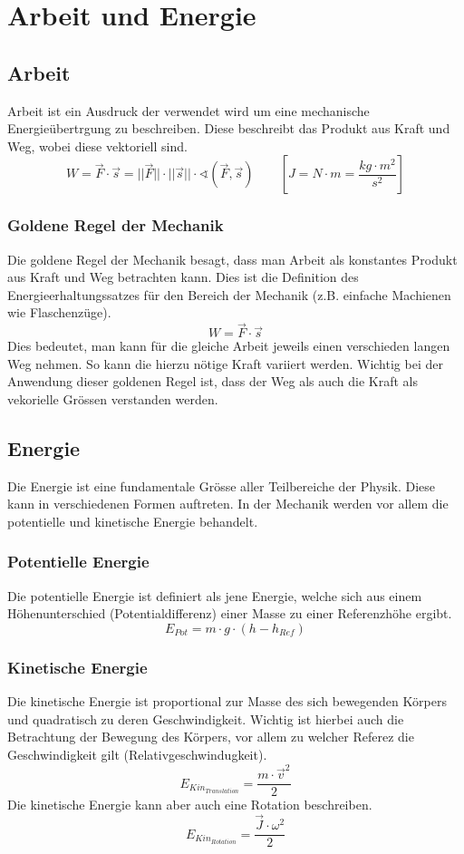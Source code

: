 \chapter{Arbeit und Energie}

\newpage
\section{Arbeit}
Arbeit ist ein Ausdruck der verwendet wird um eine mechanische 
Energieübertrgung zu beschreiben. Diese beschreibt das Produkt aus
Kraft und Weg, wobei diese vektoriell sind.
\[ \boxed{ W = \vec{F} \cdot \vec{s} 
	= ||\vec{F}|| \cdot ||\vec{s}|| \cdot 
	\sphericalangle \left( \vec{F}, \vec{s} \right) } 
	\qquad \left[ J = N \cdot m = \frac{kg \cdot m^2}{s^2} \right] \]

\subsection{Goldene Regel der Mechanik}
Die goldene Regel der Mechanik besagt, dass man Arbeit als konstantes 
Produkt aus Kraft und Weg betrachten kann. Dies ist die Definition des
Energieerhaltungssatzes für den Bereich der Mechanik (z.B. einfache
Machienen wie Flaschenzüge). 
\[ \boxed{W = \vec{F} \cdot \vec{s}} \] 
Dies bedeutet, man kann für die gleiche Arbeit jeweils einen verschieden
langen Weg nehmen. So kann die hierzu nötige Kraft variiert werden. 
Wichtig bei der Anwendung dieser goldenen Regel ist, dass der Weg als
auch die Kraft als vekorielle Grössen verstanden werden. 

\section{Energie}
Die Energie ist eine fundamentale Grösse aller Teilbereiche der Physik.
Diese kann in verschiedenen Formen auftreten. In der Mechanik werden vor
allem die potentielle und kinetische Energie behandelt.

\subsection{Potentielle Energie}
Die potentielle Energie ist definiert als jene Energie, welche sich aus
einem Höhenunterschied (Potentialdifferenz) einer Masse zu einer 
Referenzhöhe ergibt. 
\[ \boxed{ E_{Pot} = m \cdot g \cdot (h - h_{Ref}) } \]

\subsection{Kinetische Energie}
Die kinetische Energie ist proportional zur Masse des sich bewegenden Körpers
und quadratisch zu deren Geschwindigkeit. Wichtig ist hierbei auch die 
Betrachtung der Bewegung des Körpers, vor allem zu welcher Referez die 
Geschwindigkeit gilt (Relativgeschwindugkeit).
\[ \boxed{ E_{Kin_{Translation}} = \frac{m \cdot \vec{v}^2}{2} } \]
Die kinetische Energie kann aber auch eine Rotation beschreiben.
\[ \boxed{ E_{Kin_{Rotation}} = \frac{\vec{J} \cdot \omega^2}{2} } \]

